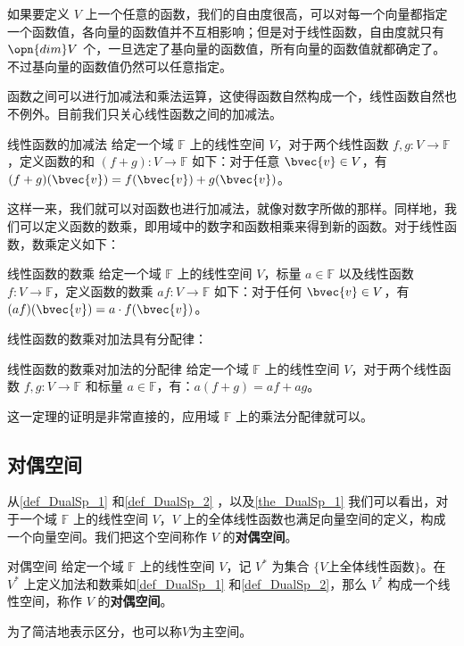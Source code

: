 如果要定义 $V$ 上一个任意的函数，我们的自由度很高，可以对每一个向量都指定一个函数值，各向量的函数值并不互相影响；但是对于线性函数，自由度就只有 $\opn{dim} V$ 个，一旦选定了基向量的函数值，所有向量的函数值就都确定了。不过基向量的函数值仍然可以任意指定。

函数之间可以进行加减法和乘法运算，这使得函数自然构成一个，线性函数自然也不例外。目前我们只关心线性函数之间的加减法。

\begin{definition}{线性函数的加减法}\label{def_DualSp_1}
给定一个域 $\mathbb{F}$ 上的线性空间 $V$，对于两个线性函数 $f, g: V\rightarrow\mathbb{F}$，定义函数的和 $(f+g):V\rightarrow\mathbb{F}$ 如下：对于任意 $\bvec{v}\in V$，有 $(f+g)(\bvec{v})=f(\bvec{v})+g(\bvec{v})$。
\end{definition}

这样一来，我们就可以对函数也进行加减法，就像对数字所做的那样。同样地，我们可以定义函数的数乘，即用域中的数字和函数相乘来得到新的函数。对于线性函数，数乘定义如下：

\begin{definition}{线性函数的数乘}\label{def_DualSp_2}
给定一个域 $\mathbb{F}$ 上的线性空间 $V$，标量 $a\in\mathbb{F}$ 以及线性函数 $f: V\rightarrow\mathbb{F}$，定义函数的数乘 $af:V\rightarrow\mathbb{F}$ 如下：对于任何 $\bvec{v}\in V$，有 $(af)(\bvec{v})=a\cdot f(\bvec{v})$。
\end{definition}

线性函数的数乘对加法具有分配律：

\begin{theorem}{线性函数的数乘对加法的分配律}\label{the_DualSp_1}
给定一个域 $\mathbb{F}$ 上的线性空间 $V$，对于两个线性函数 $f, g: V\rightarrow\mathbb{F}$ 和标量 $a\in\mathbb{F}$，有：$a(f+g)=af+ag$。
\end{theorem}

这一定理的证明是非常直接的，应用域 $\mathbb{F}$ 上的乘法分配律就可以。

\subsection{对偶空间}

从\autoref{def_DualSp_1} 和\autoref{def_DualSp_2} ，以及\autoref{the_DualSp_1} 我们可以看出，对于一个域 $\mathbb{F}$ 上的线性空间 $V$，$V$ 上的全体线性函数也满足向量空间的定义，构成一个向量空间。我们把这个空间称作 $V$ 的\textbf{对偶空间}。

\begin{definition}{对偶空间}
给定一个域 $\mathbb{F}$ 上的线性空间 $V$，记 $V^*$ 为集合 $\{V\text{上全体线性函数}\}$。在 $V^*$ 上定义加法和数乘如\autoref{def_DualSp_1} 和\autoref{def_DualSp_2}，那么 $V^*$ 构成一个线性空间，称作 $V$ 的\textbf{对偶空间}。

为了简洁地表示区分，也可以称$V$为主空间。
\end{definition}

